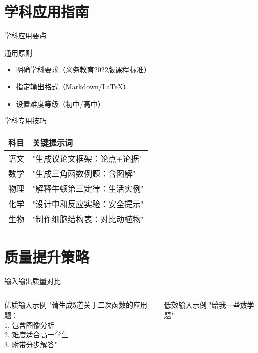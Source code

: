\documentclass[aspectratio=169]{beamer}
\begin{document}
\section{学科应用指南}
\begin{frame}{学科应用要点}
  \begin{block}{通用原则}
    \begin{itemize}
      \item 明确学科要求（义务教育2022版课程标准）
      \item 指定输出格式（Markdown/LaTeX）
      \item 设置难度等级（初中/高中）
    \end{itemize}
  \end{block}

  \begin{exampleblock}{学科专用技巧}
    \begin{tabular}{ll}
      \toprule
      科目 & 关键提示词 \\
      \midrule
      语文 & "生成议论文框架：论点+论据" \\
      数学 & "生成三角函数例题：含图解" \\
      物理 & "解释牛顿第三定律：生活实例" \\
      化学 & "设计中和反应实验：安全提示" \\
      生物 & "制作细胞结构表：对比动植物" \\
      \bottomrule
    \end{tabular}
  \end{exampleblock}
\end{frame}

\section{质量提升策略}
\begin{frame}[t]{输入输出质量对比}
  \begin{columns}
    \begin{block}{优质输入示例}
      \footnotesize
      "请生成5道关于二次函数的应用题：\\
      1. 包含图像分析\\
      2. 难度适合高一学生\\
      3. 附带分步解答"
    \end{block}

    \begin{alertblock}{低效输入示例}
      \footnotesize
      "给我一些数学题"
    \end{alertblock}
  \end{columns}
\end{frame}
\end{document}
